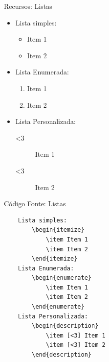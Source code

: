 \begin{frame}{Recursos: Listas}
    \begin{itemize}
    \item Lista simples:
        \begin{itemize}
            \item Item 1
            \item Item 2
        \end{itemize}
    \item Lista Enumerada:
        \begin{enumerate}
            \item Item 1
            \item Item 2
        \end{enumerate}
    \item Lista Personalizada:
        \begin{description}
            \item [<3] Item 1
            \item [<3] Item 2
        \end{description}
    \end{itemize}
\end{frame}
\begin{frame}[fragile]{Código Fonte: Listas}
    \begin{lstlisting}
    Lista simples:
        \begin{itemize}
            \item Item 1
            \item Item 2
        \end{itemize}
    Lista Enumerada:
        \begin{enumerate}
            \item Item 1
            \item Item 2
        \end{enumerate}
    Lista Personalizada:
        \begin{description}
            \item [<3] Item 1
            \item [<3] Item 2
        \end{description}
    \end{lstlisting}
\end{frame}

